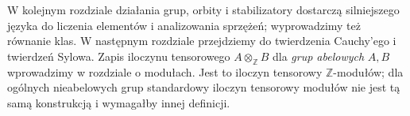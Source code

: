 \begin{uwaga}[Co dalej?]
W kolejnym rozdziale działania grup, orbity i stabilizatory
dostarczą silniejszego języka do liczenia elementów i analizowania
sprzężeń; wyprowadzimy też równanie klas. W następnym rozdziale
przejdziemy do twierdzenia Cauchy'ego i twierdzeń Sylowa.
Zapis iloczynu tensorowego $A\otimes_{\mathbb Z}B$
dla \emph{grup abelowych} $A,B$ wprowadzimy w rozdziale o modułach.
Jest to iloczyn tensorowy $\mathbb Z$-modułów; dla ogólnych
nieabelowych grup standardowy iloczyn tensorowy modułów nie jest
tą samą konstrukcją i wymagałby innej definicji.
\end{uwaga}
